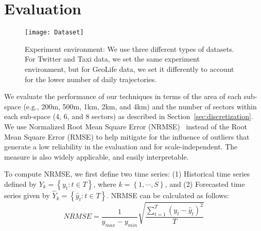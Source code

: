 \section{Evaluation}

\begin{figure}[tb]
	\centering
	\texttt{[image: Dataset]}
	\caption{Experiment environment: We use three different types of datasets. For Twitter and Taxi data, we set the same experiment environment, but for GeoLife data, we set it differently to account for the lower number of daily trajectories.}
	\label{fig:dataset}
\end{figure}

We evaluate the performance of our techniques in terms of the area of each sub-space (e.g., 200m, 500m, 1km, 2km, and 4km) and the number of sectors within each sub-space (4, 6, and 8 sectors) as described in Section~\ref{sec:discretization}. 
We use Normalized Root Mean Square Error (NRMSE)~\cite{Hyndman:2006:Another} instead of the Root Mean Square Error (RMSE) to help mitigate for the influence of outliers that generate a low reliability in the evaluation and for scale-independent.
The measure is also widely applicable, and easily interpretable. 


To compute NRMSE, we first define two time series: (1) Historical time series defined by $Y_k = \left\{y_t: t \in T\right\}$, where $k = \left\{1, \cdots, S\right\}$, and (2) Forecasted time series given by ${\hat{Y}}_k = \left\{{\hat{y}}_t: t \in T\right\}$. 
NRMSE can be calculated as follows:
\begin{equation}
NRMSE = \frac{1}{y_{max} - y_{min}}\sqrt {{\frac{{\sum\limits_{{t = 1}}^T {{{\left( {{y_t} - {{\hat{y}}_t}} \right)}^2}} }}{{T}}}}
\end{equation}

